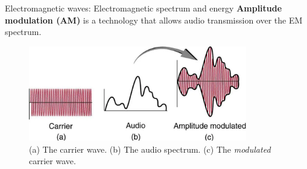 \documentclass{beamer}
\begin{document}
\begin{frame}{Electromagnetic waves: Electromagnetic spectrum and energy}
\small
\textbf{\alert{Amplitude modulation (AM)}} is a technology that allows audio transmission over the EM spectrum.
\begin{figure}
\centering
\includegraphics[width=0.85\textwidth]{figures/AM.png}
\caption{\label{fig:radio} (a) The carrier wave. (b) The audio spectrum. (c) The \textit{modulated} carrier wave.}
\end{figure}
\end{frame}
\end{document}
